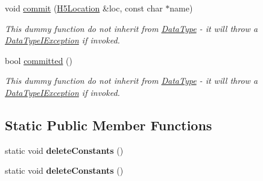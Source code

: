 \begin{DoxyCompactItemize}
void \hyperlink{class_h5_1_1_pred_type_aeb3180a69dc65f7624035a7918f8c6f7}{commit} (\hyperlink{class_h5_1_1_h5_location}{H5\+Location} \&loc, const char $\ast$name)
\begin{DoxyCompactList}\small\item\em This dummy function do not inherit from \hyperlink{class_h5_1_1_data_type}{Data\+Type} -\/ it will throw a \hyperlink{class_h5_1_1_data_type_i_exception}{Data\+Type\+I\+Exception} if invoked. \end{DoxyCompactList}\item 
\mbox{\label{class_h5_1_1_pred_type_afe9d706998d2be050a9c6f0b2604530a}} 
bool \hyperlink{class_h5_1_1_pred_type_afe9d706998d2be050a9c6f0b2604530a}{committed} ()
\begin{DoxyCompactList}\small\item\em This dummy function do not inherit from \hyperlink{class_h5_1_1_data_type}{Data\+Type} -\/ it will throw a \hyperlink{class_h5_1_1_data_type_i_exception}{Data\+Type\+I\+Exception} if invoked. \end{DoxyCompactList}\end{DoxyCompactItemize}
\subsection*{Static Public Member Functions}
\begin{DoxyCompactItemize}
\item 
\mbox{\label{class_h5_1_1_pred_type_abbed5fee28fd442379088f35cb14b20e}} 
static void {\bfseries delete\+Constants} ()
\item 
\mbox{\label{class_h5_1_1_pred_type_abbed5fee28fd442379088f35cb14b20e}} 
static void {\bfseries delete\+Constants} ()
\end{DoxyCompactItemize}

